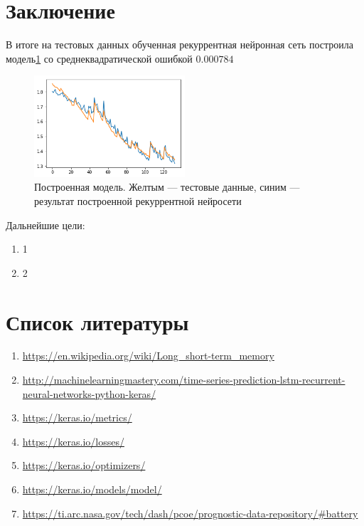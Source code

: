 \documentclass[russian,english,18pt,a4paper,reqno,dviphfm]{article}
\begin{document}
\newpage

\section{Заключение}
В итоге на тестовых данных обученная рекуррентная нейронная сеть построила модель\ref{fig:3} со среднеквадратической ошибкой $0.000784$
\begin{figure}[h!]
	\center
	\includegraphics[width=0.5\textwidth]{pic/model.png}
	\caption{Построенная модель. Желтым --- тестовые данные, синим --- результат построенной рекуррентной нейросети} 
	\label{fig:3}
\end{figure}

Дальнейшие цели:
\begin{enumerate}
 	\item 1 
 	\item 2
\end{enumerate}
\newpage
\pagestyle{plain}
\section*{Список литературы}
\begin{enumerate}
	\item \href{https://en.wikipedia.org/wiki/Long\_short-term\_memory}{https://en.wikipedia.org/wiki/Long\_short-term\_memory}
	\item \href{http://machinelearningmastery.com/time-series-prediction-lstm-recurrent-neural-networks-python-keras/}{http://machinelearningmastery.com/time-series-prediction-lstm-recurrent-neural-networks-python-keras/}
	\item \href{https://keras.io/metrics/}{https://keras.io/metrics/}
	\item \href{https://keras.io/losses/}{https://keras.io/losses/}
	\item \href{https://keras.io/optimizers/}{https://keras.io/optimizers/}
	\item \href{https://keras.io/models/model/}{https://keras.io/models/model/}
	\item \href{https://ti.arc.nasa.gov/tech/dash/pcoe/prognostic-data-repository/\#battery}{https://ti.arc.nasa.gov/tech/dash/pcoe/prognostic-data-repository/\#battery}
\end{enumerate}
\end{document}
